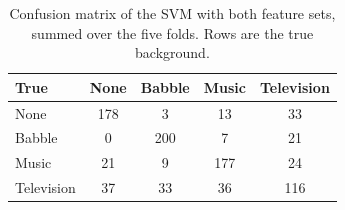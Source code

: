 \begin{table}[H]\centering\small\caption{Confusion matrix of the SVM with both feature sets, summed over the five folds. Rows are the true background.}\label{tab:bgconf}
\begin{tabular}{lcccc}\toprule True & None & Babble & Music & Television\\\midrule
None & 178 & 3 & 13 & 33\\
Babble & 0 & 200 & 7 & 21\\
Music & 21 & 9 & 177 & 24\\
Television & 37 & 33 & 36 & 116\\
\bottomrule\end{tabular}\end{table}
